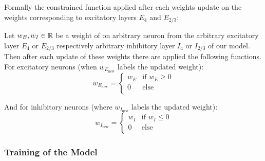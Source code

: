 Formally the constrained function applied after each weights update on the weights corresponding to excitatory layers $E_4$ and $E_{2/3}$:

\begin{defn}
    Let $w_E, w_I \in \mathbb{R}$ be a weight of on arbitrary neuron from the arbitrary excitatory layer $E_4$ or $E_{2/3}$ respectively arbitrary inhibitory layer $I_4$ or $I_{2/3}$  of our model. Then after each update of these weights there are applied the following functions. For excitatory neurons (when $w_{E_{\text{new}}}$ labels the updated weight):
    \begin{equation*}
        w_{E_{\text{new}}} =
        \begin{cases}
            w_{E} & \text{if $w_E \geq 0$} \\
            0 & \text{else} \\
        \end{cases}
    \end{equation*}
    
    And for inhibitory neurons (where $w_{I_{\text{new}}}$ labels the updated weight):
    \begin{equation*}
        w_{I_{\text{new}}} =   
        \begin{cases}
            w_{I} & \text{if $w_I \leq 0$} \\
            0 & \text{else} \\
        \end{cases}
    \end{equation*}
\end{defn}


\subsubsection{Training of the Model}
\label{subsubsec:training_model}

